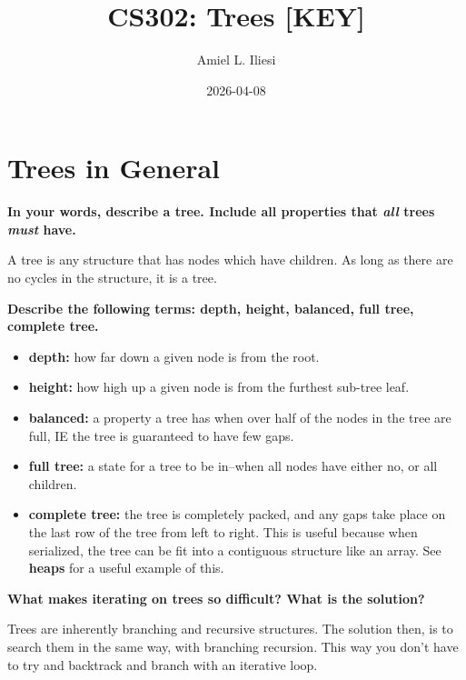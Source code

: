 \documentclass[12pt, letterpaper]{article}
\title{CS302: Trees \color{red}\textbf{[KEY]}\normalcolor}
\author{Amiel L. Iliesi}
\date{2026-04-08}
\newcommand{\question}[1]{\textbf{#1}\par}
\newenvironment{answerblock}{\color{Green4}}{\normalcolor\vspace{1em}}
\begin{document}
\maketitle

\tableofcontents

\pagebreak
\section{Trees in General}

\question{In your words, describe a tree. Include all properties that
\emph{all} trees \emph{must} have.}

\begin{answerblock}
A tree is any structure that has nodes which have children. As long as there
are no cycles in the structure, it is a tree.
\end{answerblock}

\question{Describe the following terms: depth, height, balanced, full tree, complete tree.}

\begin{answerblock}
\begin{itemize}
    \item \textbf{depth:} how far down a given node is from the root.
    \item \textbf{height:} how high up a given node is from the furthest
    sub-tree leaf.
    \item \textbf{balanced:} a property a tree has when over half of the nodes
    in the tree are full, IE the tree is guaranteed to have few gaps.
    \item \textbf{full tree:} a state for a tree to be in--when all nodes have
    either no, or all children.
    \item \textbf{complete tree:} the tree is completely packed, and any gaps
    take place on the last row of the tree from left to right. This is useful
    because when serialized, the tree can be fit into a contiguous structure
    like an array. See \textbf{heaps} for a useful example of this.
\end{itemize}
\end{answerblock}

\question{What makes iterating on trees so difficult? What is the solution?}

\begin{answerblock}
Trees are inherently branching and recursive structures. The solution then, is
to search them in the same way, with branching recursion. This way you don't
have to try and backtrack and branch with an iterative loop.
\end{answerblock}
\end{document}
